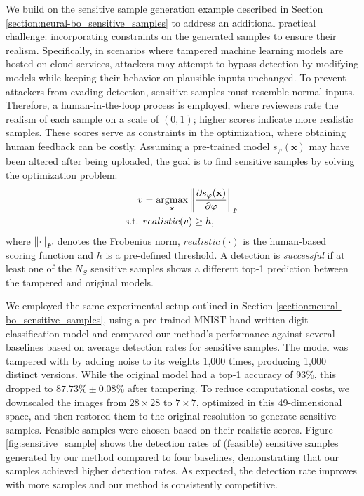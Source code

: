 We build on the sensitive sample generation example described in Section \ref{section:neural-bo_sensitive_samples} to address an additional practical challenge: incorporating constraints on the generated samples to ensure their realism. Specifically, in scenarios where tampered machine learning models are hosted on cloud services, attackers may attempt to bypass detection by modifying models while keeping their behavior on plausible inputs unchanged. To prevent attackers from evading detection, sensitive samples must resemble normal inputs. Therefore, a human-in-the-loop process is employed, where reviewers rate the realism of each sample on a scale of $(0,1)$; higher scores indicate more realistic samples. These scores serve as constraints in the optimization, where obtaining human feedback can be costly. Assuming a pre-trained model $s_\varphi(\mathbf{x})$ may have been altered after being uploaded, the goal is to find sensitive samples by solving the optimization problem: 
\begin{align*}
    v &= \operatorname*{argmax}_\mathbf{x} \norm{\frac{\partial s_\varphi(\mathbf{x})}{\partial \varphi}}_F 
    \\
    \text{s.t. } &  realistic(v) \ge h, 
\end{align*}
where $\norm{\cdot}_F$ denotes the Frobenius norm, $realistic(\cdot)$ is the human-based scoring function and $h$ is a pre-defined threshold. A detection is \emph{successful} if at least one of the $N_S$ sensitive samples shows a different top-1 prediction between the tampered and original models.  

We employed the same experimental setup outlined in Section \ref{section:neural-bo_sensitive_samples}, using a pre-trained MNIST hand-written digit classification model and compared our method's performance against several baselines based on average detection rates for sensitive samples. The model was tampered with by adding noise to its weights 1,000 times, producing 1,000 distinct versions. While the original model had a top-1 accuracy of 93\%, this dropped to $87.73\% \pm 0.08\%$ after tampering. To reduce computational costs, we downscaled the images from $28 \times 28$ to $7 \times 7$, optimized in this 49-dimensional space, and then restored them to the original resolution to generate sensitive samples. Feasible samples were chosen based on their realistic scores. Figure \ref{fig:sensitive_sample} shows the detection rates of (feasible) sensitive samples generated by our method compared to four baselines, demonstrating that our samples achieved higher detection rates. As expected, the detection rate improves with more samples and our method is consistently competitive.







